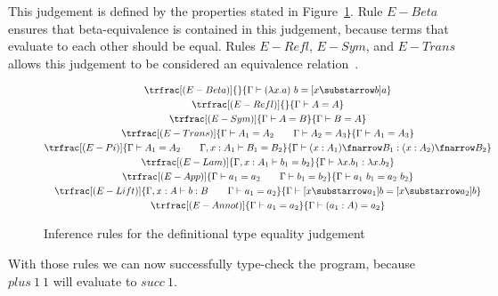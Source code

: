 This judgement is defined by the properties stated in Figure~\ref{fig:def-eq}. Rule $E-Beta$ ensures that beta-equivalence is contained in this judgement, because terms that evaluate to each other should be equal.
Rules $E-Refl$, $E-Sym$, and $E-Trans$ allows this judgement to be considered an equivalence relation~\cite{oplss}.


\begin{figure}[H]
       $$
              \begin{gathered}
                     \trfrac[(E-Beta)]{}{\Gamma \vdash (\lambda x.a)\ b = [x \substarrow b]a} \\
                     \trfrac[(E-Refl)]{}{\Gamma \vdash A = A} \\
                     \trfrac[(E-Sym)]{\Gamma \vdash A = B}{\Gamma \vdash B = A} \\
                     \trfrac[(E-Trans)]
                     {\Gamma \vdash A_1 = A_2 \qquad \Gamma \vdash A_2 = A_3}
                     {\Gamma \vdash A_1 = A_3} \\
                     \trfrac[(E-Pi)]
                     {\Gamma \vdash A_1 = A_2 \qquad \Gamma,x:A_1 \vdash B_1 = B_2}
                     {\Gamma \vdash (x:A_1) \fnarrow B_1 : (x:A_2) \fnarrow B_2} \\
                     \trfrac[(E-Lam)]
                     {\Gamma,x:A_1 \vdash b_1 = b_2}
                     {\Gamma \vdash \lambda x.b_1 : \lambda x.b_2} \\
                     \trfrac[(E-App)]
                     {\Gamma \vdash a_1 = a_2 \qquad \Gamma \vdash b_1 = b_2}
                     {\Gamma \vdash a_1\ b_1 = a_2\ b_2} \\
                     \trfrac[(E-Lift)]
                     {\Gamma, x:A \vdash b : B \qquad \Gamma \vdash a_1 = a_2}
                     {\Gamma \vdash [x \substarrow a_1]b = [x \substarrow a_2]b} \\
                     \trfrac[(E-Annot)]
                     {\Gamma \vdash a_1 = a_2}
                     {\Gamma \vdash (a_1: A) = a_2}
              \end{gathered}
       $$
       \caption{Inference rules for the definitional type equality judgement}
       \label{fig:def-eq}
\end{figure}

With those rules we can now successfully type-check the program, because $plus\ 1\ 1$ will evaluate to $succ\ 1$.

